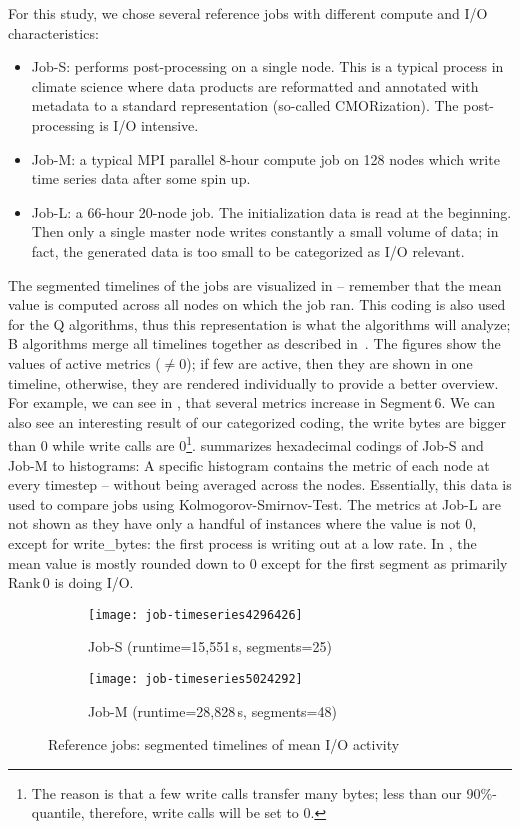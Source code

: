 \documentclass{jhps}
\begin{document}
For this study, we chose several reference jobs with different compute and I/O characteristics:
\begin{itemize}
	\item Job-S: performs post-processing on a single node. This is a typical process in climate science where data products are reformatted and annotated with metadata to a standard representation (so-called CMORization). The post-processing is I/O intensive.
  \item Job-M: a typical MPI parallel 8-hour compute job on 128 nodes which write time series data after some spin up.   %
	\item Job-L: a 66-hour 20-node job.
  The initialization data is read at the beginning.
  Then only a single master node writes constantly a small volume of data; in fact, the generated data is too small to be categorized as I/O relevant.
\end{itemize}

The segmented timelines of the jobs are visualized in  -- remember that the mean value is computed across all nodes on which the job ran.
This coding is also used for the Q algorithms, thus this representation is what the algorithms will analyze; B algorithms merge all timelines together as described in~\cite{Eugen20HPS}.
The figures show the values of active metrics ($\neq 0$); if few are active, then they are shown in one timeline, otherwise, they are rendered individually to provide a better overview.
For example, we can see in , that several metrics increase in Segment\,6. 
We can also see an interesting result of our categorized coding, the write bytes are bigger than 0 while write calls are 0\footnote{The reason is that a few write calls transfer many bytes; less than our 90\%-quantile, therefore, write calls will be set to 0.}.
 summarizes hexadecimal codings of Job-S and Job-M to histograms:
A specific histogram contains the metric of each node at every timestep -- without being averaged across the nodes.
Essentially, this data is used to compare jobs using Kolmogorov-Smirnov-Test.
The metrics at Job-L are not shown as they have only a handful of instances where the value is not 0, except for write\_bytes: the first process is writing out at a low rate.
In , the mean value is mostly rounded down to 0 except for the first segment as primarily Rank\,0 is doing I/O.

\begin{figure}
\begin{subfigure}{0.8\textwidth}
\centering
\texttt{[image: job-timeseries4296426]}
\caption{Job-S (runtime=15,551\,s, segments=25)}\label{fig:job-S}
\end{subfigure}
\centering


\begin{subfigure}{0.8\textwidth}
\centering
\texttt{[image: job-timeseries5024292]}
\caption{Job-M (runtime=28,828\,s, segments=48)}\label{fig:job-M}
\end{subfigure}
\centering


\caption{Reference jobs: segmented timelines of mean I/O activity}%
\label{fig:refJobs}
\end{figure}
\end{document}
